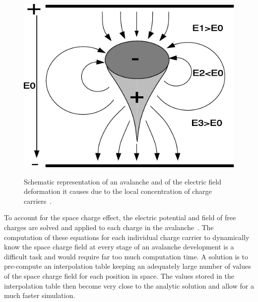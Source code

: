 	\begin{figure}
		\centering
		\includegraphics[width = .8\linewidth]{fig/chapt3/Avalanche_space_charge.pdf}\\
		\caption{\label{fig:Space_charge} Schematic representation of an avalanche and of the electric field deformation it causes due to the local concentration of charge carriers~\cite{LIPPMANN2003}.}
	\end{figure}
	
	To account for the space charge effect, the electric potential and field of free charges are solved and applied to each charge in the avalanche~\cite{LIPPMANN2003,VINCENT2017}. The computation of these equations for each individual charge carrier to dynamically know the space charge field at every stage of an avalanche development is a difficult task and would require far too much computation time. A solution is to pre-compute an interpolation table keeping an adequately large number of values of the space charge field for each position in space. The values stored in the interpolation table then become very close to the analytic solution and allow for a much faster simulation.
	
\endgroup


